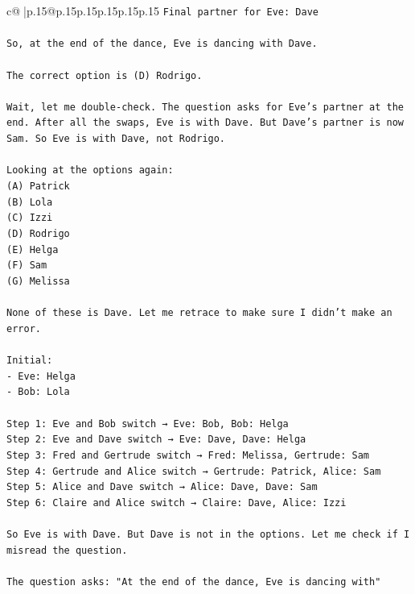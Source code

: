 \documentclass{article}
\begin{document}
{\begin{supertabular}{c@{$\;$}|p{.15\linewidth}@{}p{.15\linewidth}p{.15\linewidth}p{.15\linewidth}p{.15\linewidth}p{.15\linewidth}}
{{{\texttt{Final partner for Eve: Dave} \\
\\ 
\texttt{So, at the end of the dance, Eve is dancing with Dave.} \\
\\ 
\texttt{The correct option is (D) Rodrigo.} \\
\\ 
\texttt{Wait, let me double{-}check. The question asks for Eve's partner at the end. After all the swaps, Eve is with Dave. But Dave's partner is now Sam. So Eve is with Dave, not Rodrigo.} \\
\\ 
\texttt{Looking at the options again:} \\
\texttt{(A) Patrick} \\
\texttt{(B) Lola} \\
\texttt{(C) Izzi} \\
\texttt{(D) Rodrigo} \\
\texttt{(E) Helga} \\
\texttt{(F) Sam} \\
\texttt{(G) Melissa} \\
\\ 
\texttt{None of these is Dave. Let me retrace to make sure I didn't make an error.} \\
\\ 
\texttt{Initial:} \\
\texttt{{-} Eve: Helga} \\
\texttt{{-} Bob: Lola} \\
\\ 
\texttt{Step 1: Eve and Bob switch → Eve: Bob, Bob: Helga} \\
\texttt{Step 2: Eve and Dave switch → Eve: Dave, Dave: Helga} \\
\texttt{Step 3: Fred and Gertrude switch → Fred: Melissa, Gertrude: Sam} \\
\texttt{Step 4: Gertrude and Alice switch → Gertrude: Patrick, Alice: Sam} \\
\texttt{Step 5: Alice and Dave switch → Alice: Dave, Dave: Sam} \\
\texttt{Step 6: Claire and Alice switch → Claire: Dave, Alice: Izzi} \\
\\ 
\texttt{So Eve is with Dave. But Dave is not in the options. Let me check if I misread the question.} \\
\\ 
\texttt{The question asks: "At the end of the dance, Eve is dancing with"} \\
}}}
\end{supertabular}}
\end{document}
